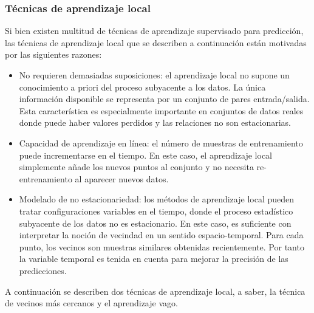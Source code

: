 \documentclass{llncs}
\begin{document}
\subsubsection{Técnicas de aprendizaje local\\}
Si bien existen multitud de técnicas de aprendizaje supervisado para predicción, las técnicas de aprendizaje local que se describen a continuación están motivadas por las siguientes razones:
\begin{itemize}

\item{} No requieren demasiadas suposiciones: el aprendizaje local no supone un conocimiento a priori del proceso subyacente a los datos. La única información disponible se representa por un conjunto de pares entrada/salida. Esta característica es especialmente importante en conjuntos de datos reales donde puede haber valores perdidos y las relaciones no son estacionarias. 

\item{}Capacidad de aprendizaje en línea: el número de muestras de entrenamiento puede incrementarse en el tiempo. En este caso, el aprendizaje local simplemente añade los nuevos puntos al conjunto y no necesita re-entrenamiento al aparecer nuevos datos.

\item{}Modelado de no estacionariedad: los métodos de aprendizaje local pueden tratar configuraciones variables en el tiempo, donde el proceso estadístico subyacente de los datos no es estacionario. En este caso, es suficiente con interpretar la noción de vecindad en un sentido espacio-temporal. Para cada punto, los vecinos son muestras similares obtenidas recientemente. Por tanto la variable temporal es tenida en cuenta para mejorar la precisión de las predicciones.
\end{itemize}
A continuación se describen dos técnicas de aprendizaje local, a saber, la técnica de vecinos más cercanos y el aprendizaje vago.
\end{document}
